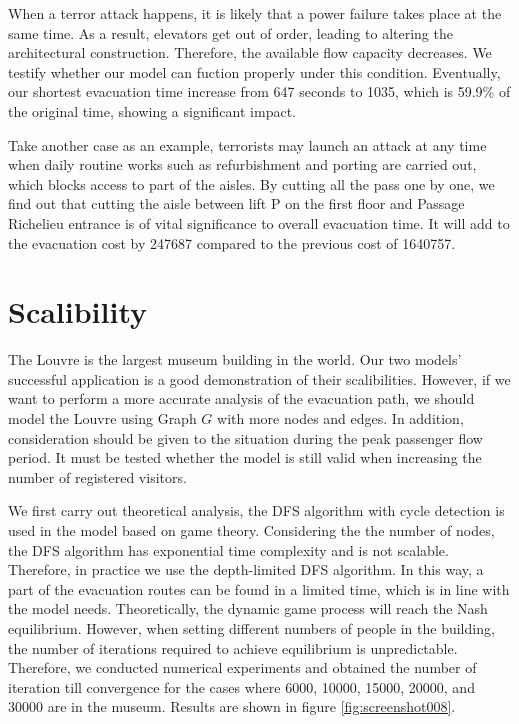\documentclass{mcmthesis}
\begin{document}
When a terror attack happens, it is likely that a power failure takes place at the same time. As a result, elevators get out of order, leading to altering the architectural construction. Therefore, the available flow capacity decreases. We testify whether our model can fuction properly under this condition. Eventually, our shortest evacuation time increase from 647 seconds to 1035, which is 59.9\% of the original time, showing a significant impact.

Take another case as an example,  terrorists may launch an attack at any time when daily routine works such as refurbishment and porting are carried out, which blocks access to part of the aisles. By cutting all the pass one by one, we find out that cutting the aisle between lift P on the first floor and Passage Richelieu entrance is of vital significance to overall evacuation time. It will add to the evacuation cost by 247687 compared to the previous cost of 1640757.

\section {Scalibility}
The Louvre is the largest museum building in the world. Our two models' successful application is a good demonstration of their scalibilities. However, if we want to perform a more accurate analysis of the evacuation path, we should model the Louvre using Graph $G$ with more nodes and edges. In addition, consideration should be given to the situation during the peak passenger flow period.  It must be tested whether the model is still valid when increasing the number of registered visitors.

We first carry out theoretical analysis,  the DFS algorithm with cycle detection is used in the model based on game theory. Considering the the number of nodes, the DFS algorithm has exponential time complexity and is not scalable. Therefore, in practice we use the depth-limited DFS algorithm. In this way, a part of the  evacuation routes can be found in a limited time, which is in line with the model needs.
Theoretically, the dynamic game process will reach the Nash equilibrium. However, when setting different numbers of people in the building, the number of iterations required to achieve equilibrium is unpredictable. Therefore, we conducted numerical experiments and obtained the number of iteration till convergence for the cases where 6000, 10000, 15000, 20000, and 30000 are in the museum. Results are shown in figure \ref{fig:screenshot008}.
\end{document}
